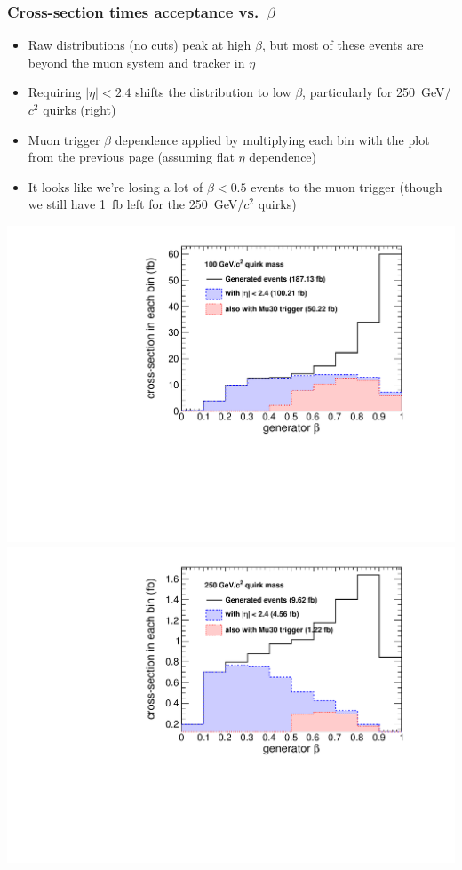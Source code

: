 \documentclass[compress]{beamer}
\begin{document}
\begin{frame}
\frametitle{Cross-section times acceptance vs.\ $\beta$}

\begin{itemize}
\item Raw distributions (no cuts) peak at high $\beta$, but most of these events are beyond the muon system and tracker in $\eta$
\item Requiring $|\eta| < 2.4$ shifts the distribution to low $\beta$, particularly for 250~GeV/$c^2$ quirks (right)
\item Muon trigger $\beta$ dependence applied by multiplying each bin with the plot from the previous page (assuming flat $\eta$ dependence)
\item It looks like we're losing a lot of $\beta < 0.5$ events to the muon trigger (though we still have 1~fb left for the 250~GeV/$c^2$ quirks)
\end{itemize}

\includegraphics[width=0.5\linewidth]{mutrigger_100gev.pdf}
\includegraphics[width=0.5\linewidth]{mutrigger_250gev.pdf}
\end{frame}
\end{document}
